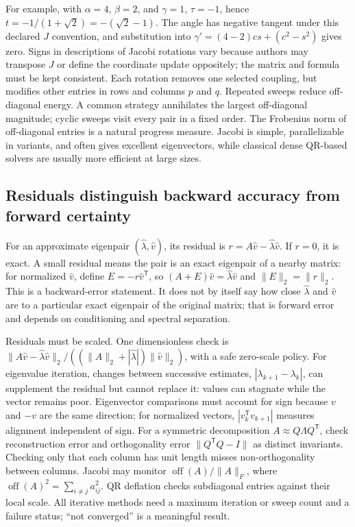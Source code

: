 For example, with \(\alpha=4\), \(\beta=2\), and \(\gamma=1\), \(\tau=-1\), hence \(t=-1/(1+\sqrt2)=-(\sqrt2-1)\). The angle has negative tangent under this declared \(J\) convention, and substitution into \(\gamma'=(4-2)cs+(c^2-s^2)\) gives zero. Signs in descriptions of Jacobi rotations vary because authors may transpose \(J\) or define the coordinate update oppositely; the matrix and formula must be kept consistent. Each rotation removes one selected coupling, but modifies other entries in rows and columns \(p\) and \(q\). Repeated sweeps reduce off-diagonal energy. A common strategy annihilates the largest off-diagonal magnitude; cyclic sweeps visit every pair in a fixed order. The Frobenius norm of off-diagonal entries is a natural progress measure. Jacobi is simple, parallelizable in variants, and often gives excellent eigenvectors, while classical dense QR-based solvers are usually more efficient at large sizes.

\subsection{Residuals distinguish backward accuracy from forward certainty}\label{01-foundations-i-ch020-residuals-distinguish-backward-accuracy-from-forward-certainty}

\hypertarget{01-foundations-i-ch020-residuals-distinguish-backward-accuracy-from-forward-certainty}{}

For an approximate eigenpair \((\hat\lambda,\hat v)\), its residual is \(r=A\hat v-\hat\lambda\hat v\). If \(r=0\), it is exact. A small residual means the pair is an exact eigenpair of a nearby matrix: for normalized \(\hat v\), define \(E=-r\hat v^\mathsf T\), so \((A+E)\hat v=\hat\lambda\hat v\) and \(\|E\|_2=\|r\|_2\). This is a backward-error statement. It does not by itself say how close \(\hat\lambda\) and \(\hat v\) are to a particular exact eigenpair of the original matrix; that is forward error and depends on conditioning and spectral separation.

Residuals must be scaled. One dimensionless check is \(\|A\hat v-\hat\lambda\hat v\|_2/((\|A\|_2+|\hat\lambda|)\|\hat v\|_2)\), with a safe zero-scale policy. For eigenvalue iteration, changes between successive estimates, \(|\lambda_{k+1}-\lambda_k|\), can supplement the residual but cannot replace it: values can stagnate while the vector remains poor. Eigenvector comparisons must account for sign because \(v\) and \(-v\) are the same direction; for normalized vectors, \(|v_k^\mathsf Tv_{k+1}|\) measures alignment independent of sign. For a symmetric decomposition \(A\approx Q\Lambda Q^\mathsf T\), check reconstruction error and orthogonality error \(\|Q^\mathsf TQ-I\|\) as distinct invariants. Checking only that each column has unit length misses non-orthogonality between columns. Jacobi may monitor \(\operatorname{off}(A)/\|A\|_F\), where \(\operatorname{off}(A)^2=\sum_{i\ne j}a_{ij}^2\). QR deflation checks subdiagonal entries against their local scale. All iterative methods need a maximum iteration or sweep count and a failure status; ``not converged'' is a meaningful result.

